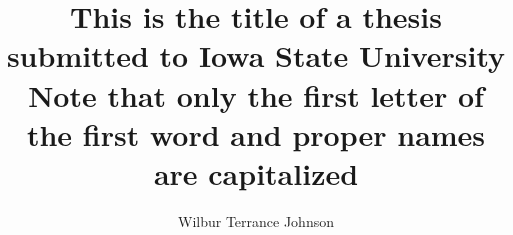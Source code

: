\title{This is the title of a thesis
submitted to Iowa State University\\
Note that only the first letter of
the first word and proper names
are capitalized}

\author{Wilbur Terrance Johnson}

\notice


\maketitle
